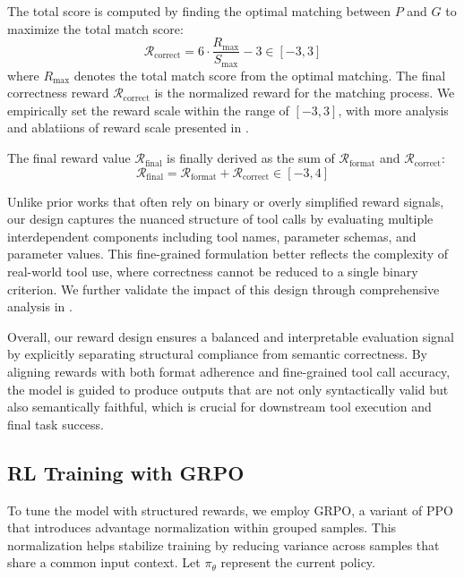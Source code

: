 \vspace{5pt} \noindent
The total score is computed by finding the optimal matching between \( P \) and \( G \) to maximize the total match score:
\begin{equation*}
\mathcal{R}_{\text{correct}} = 6 \cdot \frac{R_{\max}}{S_{\max}} - 3 \in [-3, 3]
\end{equation*}
where \( R_{\max} \) denotes the total match score from the optimal matching. The final correctness reward \( \mathcal{R}_{\text{correct}} \) is the normalized reward for the matching process. We empirically set the reward scale within the range of \( [-3, 3] \), with more analysis and ablatiions of reward scale presented in .

The final reward value \( \mathcal{R}_{\text{final}} \) is finally derived as the sum of \( \mathcal{R}_{\text{format}} \) and \( \mathcal{R}_{\text{correct}} \):
\[
\mathcal{R}_{\text{final}} = \mathcal{R}_{\text{format}} + \mathcal{R}_{\text{correct}} \in [-3, 4]
\]

Unlike prior works that often rely on binary or overly simplified reward signals, our design captures the nuanced structure of tool calls by evaluating multiple interdependent components including tool names, parameter schemas, and parameter values. This fine-grained formulation better reflects the complexity of real-world tool use, where correctness cannot be reduced to a single binary criterion. We further validate the impact of this design through comprehensive analysis in .

Overall, our reward design ensures a balanced and interpretable evaluation signal by explicitly separating structural compliance from semantic correctness. By aligning rewards with both format adherence and fine-grained tool call accuracy, the model is guided to produce outputs that are not only syntactically valid but also semantically faithful, which is crucial for downstream tool execution and final task success.


\subsection{RL Training with GRPO}
\label{sec:rl_training}
To tune the model with structured rewards, we employ GRPO, a variant of PPO that introduces advantage normalization within grouped samples. This normalization helps stabilize training by reducing variance across samples that share a common input context. Let \(\pi_\theta\) represent the current policy.


